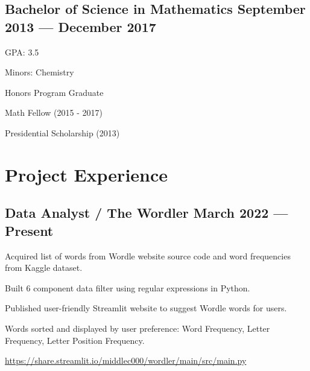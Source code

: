 \documentclass[letter,10pt]{article}
\begin{document}
\subsection{{Bachelor of Science in Mathematics \hfill September 2013 --- December 2017}}
\begin{zitemize}
    \item GPA: 3.5
    \item Minors: Chemistry
    \item Honors Program Graduate
    \item Math Fellow (2015 - 2017)
    \item Presidential Scholarship (2013)
\end{zitemize}

\section{Project Experience}
\subsection{{Data Analyst / The Wordler \hfill March 2022 --- Present}}
\begin{zitemize}
    \item Acquired list of words from Wordle website source code and word frequencies from Kaggle dataset.
    \item Built 6 component data filter using regular expressions in Python.
    \item Published user-friendly Streamlit website to suggest Wordle words for users.
    \item Words sorted and displayed by user preference: Word Frequency, Letter Frequency, Letter Position Frequency.
    \item \url{https://share.streamlit.io/middlec000/wordler/main/src/main.py}
\end{zitemize}
\end{document}
